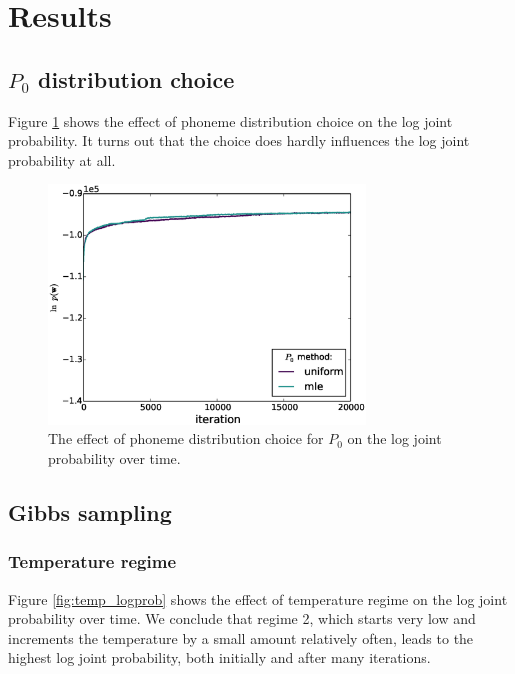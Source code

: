 \section{Results}

\subsection{$P_0$ distribution choice}

Figure \ref{fig:P0_logprob} shows the effect of phoneme distribution choice on the log joint probability. It turns out that the choice does hardly influences the log joint probability at all.

\begin{figure}
  \centering
    \includegraphics[width=0.75\textwidth]{images/P0_method-log_prob}
  \caption{The effect of phoneme distribution choice for $P_0$ on the log joint probability over time.}
  \label{fig:P0_logprob}
\end{figure}

\subsection{Gibbs sampling}

\subsubsection{Temperature regime}

Figure \ref{fig:temp_logprob} shows the effect of temperature regime on the log joint probability over time. We conclude that regime 2, which starts very low and increments the temperature by a small amount relatively often, leads to the highest log joint probability, both initially and after many iterations.


